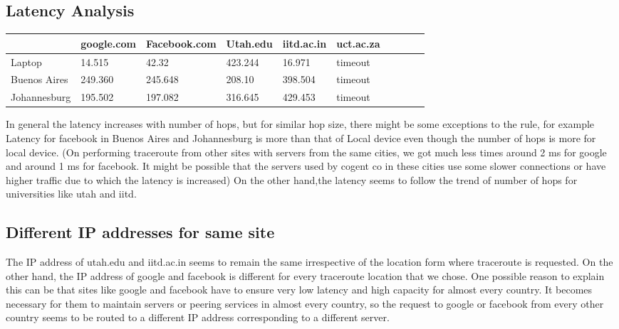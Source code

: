 \subsection*{Latency Analysis}


\begin{table}[!ht]
    \centering
    \begin{tabular}{|l|l|l|l|l|l|l|l|l|l|}
    \hline
        ~ & google.com & Facebook.com & Utah.edu & iitd.ac.in & uct.ac.za \\ \hline
        Laptop & 14.515 & 42.32 & 423.244 & 16.971 & timeout  \\ \hline
        Buenos Aires & 249.360 & 245.648 & 208.10 & 398.504 & timeout  \\ \hline
        Johannesburg & 195.502 & 197.082 & 316.645 & 429.453 & timeout \\ \hline
    \end{tabular}
\end{table}


In general the latency increases with number of hops, but for similar hop size, there might be some exceptions to the rule, for example 
Latency for facebook in Buenos Aires and Johannesburg is more than that of Local device even though the number of hops is more for local device.
(On performing traceroute from other sites with servers from the same cities,
we got much less times around 2 ms for google and around 1 ms for facebook. It might be possible that the servers used by cogent co in these cities use some slower connections or have higher traffic due to which the latency is increased)
On the other hand,the latency seems to follow the trend of number of hops for universities like utah and iitd.

\subsection*{Different IP addresses for same site}

The IP address of utah.edu and iitd.ac.in seems to remain the same irrespective of the location form where traceroute is requested.
On the other hand, the IP address of google and facebook is different for every traceroute location that we chose.
One possible reason to explain this can be that sites like google and facebook have to ensure very low latency and high capacity for
almost every country. It becomes necessary for them to maintain servers or peering services in almost every country, so the request to 
google or facebook from every other country seems to be routed to a different IP address corresponding to a different server.


